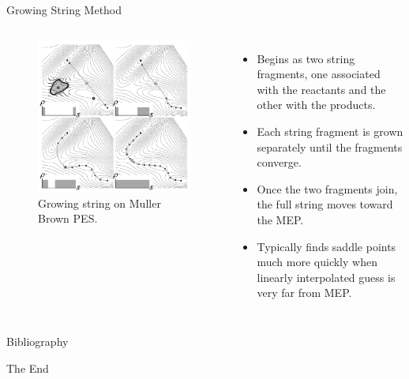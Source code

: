 \documentclass[aspectratio=169]{beamer}
\begin{document}
\begin{frame}{Growing String Method}
\begin{columns}

\begin{figure}
    \centering
    \includegraphics[width=0.8\linewidth]{lectures/figures/12-Growing_String.png}
    \caption{Growing string on Muller Brown PES.\cite{petersGrowingStringMethod2004}}
\end{figure} 


\begin{itemize}
    \item Begins as two string fragments, one associated with the reactants and the other with the products. 
    \item Each string fragment is grown separately until the fragments converge.
    \item Once the two fragments join, the full string moves toward the MEP.
    \item Typically finds saddle points much more quickly when linearly interpolated guess is very far from MEP.
\end{itemize}

\end{columns} 
\end{frame} 


    \begin{frame}[allowframebreaks]{Bibliography}
        
        
    \end{frame}



    \begin{frame}
        \Huge{\centerline{The End}}
    \end{frame}
\end{document}
